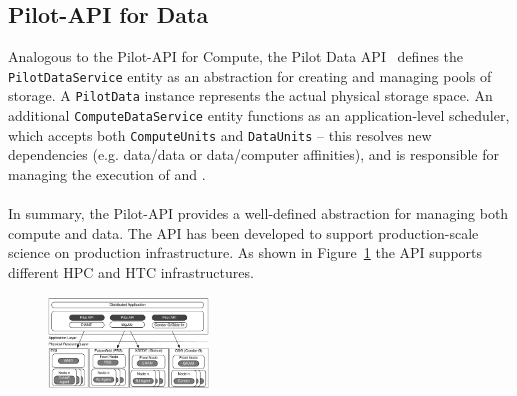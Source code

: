 \documentclass[conference]{IEEEtran}
\begin{document}


\subsection{Pilot-API for Data}

Analogous to the Pilot-API for Compute, the Pilot Data
API~\cite{pilot_api} defines the \texttt{PilotDataService} entity as
an abstraction for creating and managing pools of storage. A
\texttt{PilotData} instance represents the actual physical storage
space. An additional \texttt{ComputeDataService} entity functions as an
application-level scheduler, which accepts both
\texttt{Compute\-Units} and \texttt{DataUnits} -- this resolves new
dependencies (e.g. data/data or data/computer affinities), and is
responsible for managing the execution of \dus and \cus.\\
\\
In summary, the Pilot-API provides a well-defined abstraction for managing
both compute and data. The API has been developed to support production-scale
science on production infrastructure. As shown in
Figure~\ref{fig:figures_distributed_pilot_job} the API supports different HPC
and HTC infrastructures.


\begin{figure}[t]

    \begin{center}
\includegraphics[width=0.38\textwidth]{../figures/distributed_pilot_job.pdf}
    \caption{\label{fig:figures_distributed_pilot_job}}
	\upp\upp\upp
  \end{center}    
\end{figure}
\end{document}
